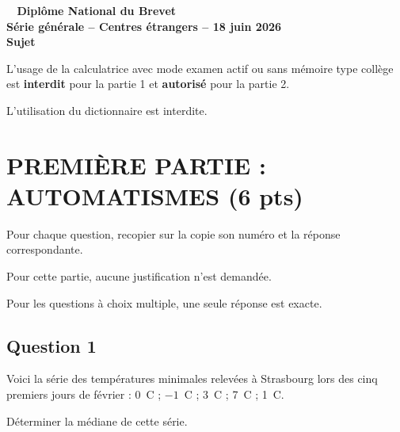 \documentclass[12pt,a4paper,french]{article}
\begin{document}
\pagestyle{fancy}

\thispagestyle{empty}


\begin{center}
{\Large \textbf{
		\decofourleft~ Diplôme National du Brevet ~\decofourright\\[10pt]
		Série générale -- Centres étrangers -- 18 juin 2026
		\\[10pt]
		Sujet\\[10pt]}}
\end{center}

L'usage de la calculatrice avec mode examen actif ou sans mémoire \og type collège \fg{} est \textbf{interdit} pour la partie 1 et \textbf{autorisé} pour la partie 2.

L'utilisation du dictionnaire est interdite.

\bigskip

\section*{\centering PREMIÈRE PARTIE : AUTOMATISMES (6 pts)}

Pour chaque question, recopier sur la copie son numéro et la réponse correspondante.

Pour cette partie, aucune justification n'est demandée.

Pour les questions à choix multiple, une seule réponse est exacte.

\subsection*{Question 1}

Voici la série des températures minimales relevées à Strasbourg lors des cinq premiers jours de février : 0~\degres C ; $-1$~\degres C ; 3~\degres C ; 7~\degres C ; 1~\degres C.

Déterminer la médiane de cette série.
\end{document}
